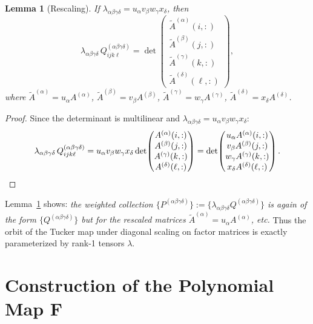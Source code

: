 \documentclass[12pt]{article}
\newtheorem{lemma}[theorem]{Lemma}
\theoremstyle{definition}
\begin{document}
\begin{lemma}[Rescaling]\label{lem:rescale}
If $\lambda_{\alpha\beta\gamma\delta} = u_\alpha v_\beta w_\gamma x_\delta$, then
\begin{equation}\label{eq:rescaling}
\lambda_{\alpha\beta\gamma\delta}\, Q^{(\alpha\beta\gamma\delta)}_{ijk\ell}
= \det\!\begin{pmatrix} \widetilde{A}^{(\alpha)}(i,:) \\ \widetilde{A}^{(\beta)}(j,:) \\ \widetilde{A}^{(\gamma)}(k,:) \\ \widetilde{A}^{(\delta)}(\ell,:) \end{pmatrix},
\end{equation}
where $\widetilde{A}^{(\alpha)} = u_\alpha A^{(\alpha)}$, $\widetilde{A}^{(\beta)} = v_\beta A^{(\beta)}$, $\widetilde{A}^{(\gamma)} = w_\gamma A^{(\gamma)}$, $\widetilde{A}^{(\delta)} = x_\delta A^{(\delta)}$.
\end{lemma}

\begin{proof}
Since the determinant is multilinear and $\lambda_{\alpha\beta\gamma\delta} = u_\alpha v_\beta w_\gamma x_\delta$:
\[
\lambda_{\alpha\beta\gamma\delta}\,Q^{(\alpha\beta\gamma\delta)}_{ijk\ell}
= u_\alpha v_\beta w_\gamma x_\delta \det\!\begin{pmatrix}A^{(\alpha)}(i,:) \\ A^{(\beta)}(j,:) \\ A^{(\gamma)}(k,:) \\ A^{(\delta)}(\ell,:)\end{pmatrix}
= \det\!\begin{pmatrix}u_\alpha A^{(\alpha)}(i,:) \\ v_\beta A^{(\beta)}(j,:) \\ w_\gamma A^{(\gamma)}(k,:) \\ x_\delta A^{(\delta)}(\ell,:)\end{pmatrix}. \qedhere
\]
\end{proof}

Lemma~\ref{lem:rescale} shows: \emph{the weighted collection $\{P^{(\alpha\beta\gamma\delta)}\} := \{\lambda_{\alpha\beta\gamma\delta}Q^{(\alpha\beta\gamma\delta)}\}$ is again of the form $\{Q^{(\alpha\beta\gamma\delta)}\}$ but for the rescaled matrices $\widetilde{A}^{(\alpha)} = u_\alpha A^{(\alpha)}$, etc.} Thus the orbit of the Tucker map under diagonal scaling on factor matrices is exactly parameterized by rank-1 tensors $\lambda$.

\section{Construction of the Polynomial Map $\mathbf{F}$}
\end{document}

